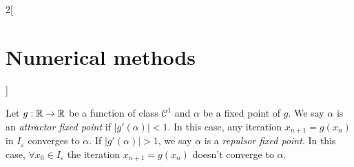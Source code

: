 \documentclass[../../../main.tex]{subfiles}
\begin{document}
\begin{multicols}{2}[\section{Numerical methods}]
\begin{corollary}
\end{corollary}
\begin{definition}
    Let $g:\mathbb{R}\rightarrow\mathbb{R}$ be a function of class $\mathcal{C}^1$ and $\alpha$ be a fixed point of $g$. We say $\alpha$ is an \textit{attractor fixed point} if $|g'(\alpha)|<1$. In this case, any iteration $x_{n+1}=g(x_n)$ in $I_\varepsilon$ converges to $\alpha$. If $|g'(\alpha)|>1$, we say $\alpha$ is a \textit{repulsor fixed point}. In this case, $\forall x_0\in I_\varepsilon$ the iteration $x_{n+1}=g(x_n)$ doesn't converge to $\alpha$.
\end{definition}
\begin{center}
    \hfill
    \\
    \vspace{0.02\linewidth}
    \hfill
    
\end{center}

\end{multicols}
\end{document}
